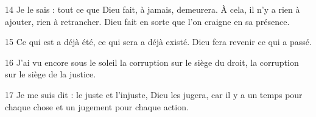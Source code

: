 
14 Je le sais : tout ce que Dieu fait, à jamais, demeurera. À cela, il n’y a rien à ajouter, rien à retrancher. Dieu fait en sorte que l’on craigne en sa présence.

15 Ce qui est a déjà été, ce qui sera a déjà existé. Dieu fera revenir ce qui a passé.

16 J’ai vu encore sous le soleil la corruption sur le siège du droit, la corruption sur le siège de la justice.

17 Je me suis dit : le juste et l’injuste, Dieu les jugera, car il y a un temps pour chaque chose et un jugement pour chaque action.